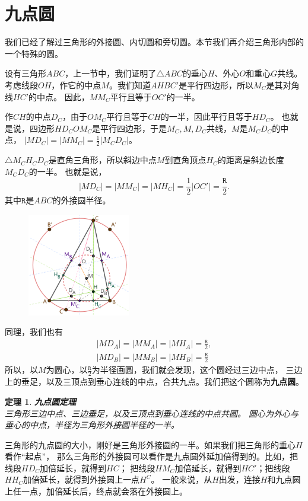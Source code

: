 \documentclass[12pt,UTF8]{ctexbook}
\newtheorem{tm}{定理}[section]
\begin{document}
\section{九点圆}

我们已经了解过三角形的外接圆、内切圆和旁切圆。本节我们再介绍三角形内部的一个特殊的圆。

设有三角形$ABC$，上一节中，我们证明了$\triangle ABC$的垂心$H$、外心$O$和重心$G$共线。
考虑线段$OH$，作它的中点$M$。我们知道$AHBC'$是平行四边形，所以$M_C$是其对角线$HC'$的中点。
因此，$MM_C$平行且等于$OC'$的一半。

作$CH$的中点$D_C$，由于$OM_C$平行且等于$CH$的一半，因此平行且等于$HD_C$。
也就是说，四边形$HD_COM_C$是平行四边形，于是$M_C, M, D_C$共线，$M$是$M_CD_C$的中点，
$|MD_C| = |MM_C| = \frac12 |M_CD_C|$。

$\triangle M_CH_CD_C$是直角三角形，所以斜边中点$M$到直角顶点$H_C$的距离是斜边长度$M_CD_C$的一半。
也就是说，
$$ |MD_C| = |MM_C| = |MH_C| = \frac12 |OC'| = \frac{\mathtt{R}}{2}.$$
其中$\mathtt{R}$是$ABC$的外接圆半径。

\begin{figure} %
    \vspace{-20pt}
    \flushright
    \includegraphics[width=0.4\textwidth]{tu/九点圆1.png}
\end{figure}

同理，我们也有
\begin{align*}
    |MD_A| = |MM_A| = |MH_A| = \frac{\mathtt{R}}{2},  \\
    |MD_B| = |MM_B| = |MH_B| = \frac{\mathtt{R}}{2}  
\end{align*} 
所以，以$M$为圆心，以$\frac{\mathtt{R}}{2}$为半径画圆，我们就会发现，这个圆经过三边中点，
三边上的垂足，以及三顶点到垂心连线的中点，合共九点。我们把这个圆称为\textbf{九点圆}。

\begin{tm}{\textbf{九点圆定理}}\label{tm:1-3-10}
    \mbox{} \\
    三角形三边中点、三边垂足，以及三顶点到垂心连线的中点共圆。
    圆心为外心与垂心的中点，半径为三角形外接圆半径的一半。
\end{tm}
三角形的九点圆的大小，刚好是三角形外接圆的一半。如果我们把三角形的垂心$H$看作“起点”，
那么三角形的外接圆可以看作是九点圆外延加倍得到的。比如，把线段$HD_C$加倍延长，就得到$HC$；
把线段$HM_C$加倍延长，就得到$HC'$；把线段$HH_C$加倍延长，就得到外接圆上一点$H^C$。
一般来说，从$H$出发，连接$H$和九点圆上任一点，加倍延长后，终点就会落在外接圆上。
\end{document}
